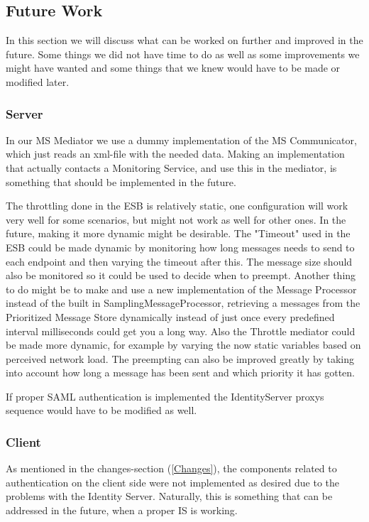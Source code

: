 \subsection{Future Work}\label{Future Work}
    In this section we will discuss what can be worked on further and improved in the future. Some things we did not have time to do as well as some improvements we might have wanted and some things that we knew would have to be made or modified later.

    \subsubsection{Server}\label{Future:Server}
        In our MS Mediator we use a dummy implementation of the MS Communicator, which just reads an xml-file with the needed data. Making an implementation that actually contacts a Monitoring Service, and use this in the mediator, is something that should be implemented in the future.

        The throttling done in the ESB is relatively static, one configuration will work very well for some scenarios, but might not work as well for other ones. In the future, making it more dynamic might be desirable. The "Timeout" used in the ESB could be made dynamic by monitoring how long messages needs to send to each endpoint and then varying the timeout after this. The message size should also be monitored so it could be used to decide when to preempt. Another thing to do might be to make and use a new implementation of the Message Processor instead of the built in SamplingMessageProcessor, retrieving a messages from the Prioritized Message Store dynamically instead of just once every predefined interval milliseconds could get you a long way. Also the Throttle mediator could be made more dynamic, for example by varying the now static variables based on perceived network load. The preempting can also be improved greatly by taking into account how long a message has been sent and which priority it has gotten.

        If proper SAML authentication is implemented the IdentityServer proxys sequence would have to be modified as well.

	\subsubsection{Client}\label{Future:Client}
		As mentioned in the changes-section (\ref{Changes}), the components related to authentication on the client side were not implemented as desired due to the problems with the Identity Server. Naturally, this is something that can be addressed in the future, when a proper IS is working.

